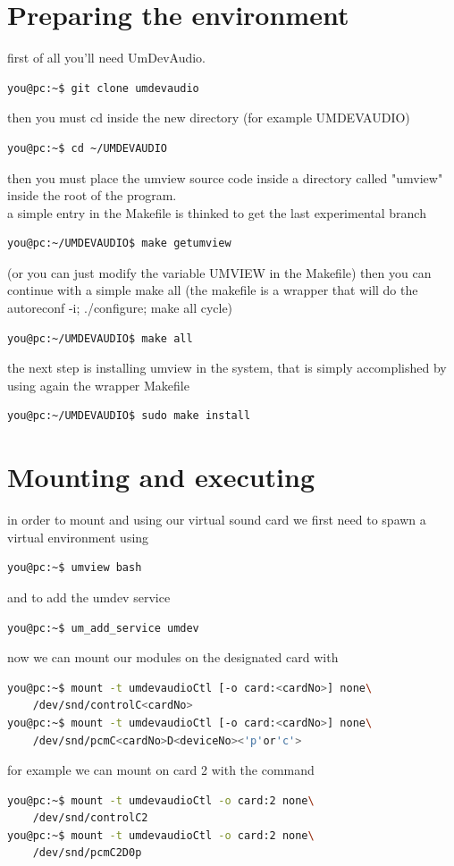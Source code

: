 \documentclass[a4paper,12pt]{article}
\begin{document}
	\section{Preparing the environment}
	first of all you'll need UmDevAudio.\\
	\begin{lstlisting}[frame=double, language=Bash]
you@pc:~$ git clone umdevaudio
	\end{lstlisting}
	then you must cd inside the new directory (for example UMDEVAUDIO)
	\begin{lstlisting}[frame=double, language=Bash]
you@pc:~$ cd ~/UMDEVAUDIO
	\end{lstlisting}
	then you must place the umview source code inside a directory called "umview" inside the root of the program.\\
	a simple entry in the Makefile is thinked to get the last experimental branch
	\begin{lstlisting}[frame=double, language=Bash]
you@pc:~/UMDEVAUDIO$ make getumview
	\end{lstlisting}
	(or you can just modify the variable UMVIEW in the Makefile)
	then you can continue with a simple make all (the makefile is a wrapper that will do the autoreconf -i; ./configure; make all cycle)
	\begin{lstlisting}[frame=double, language=Bash]
you@pc:~/UMDEVAUDIO$ make all
	\end{lstlisting}
	the next step is installing umview in the system, that is simply accomplished by using again the wrapper Makefile
	\begin{lstlisting}[frame=double, language=Bash]
you@pc:~/UMDEVAUDIO$ sudo make install
	\end{lstlisting}

	\section{Mounting and executing}
	in order to mount and using our virtual sound card we first need to spawn a virtual environment using
	\begin{lstlisting}[frame=double, language=Bash]
you@pc:~$ umview bash
	\end{lstlisting}
	and to add the umdev service
	\begin{lstlisting}[frame=double, language=Bash]
you@pc:~$ um_add_service umdev
	\end{lstlisting}
	now we can mount our modules on the designated card with
	\begin{lstlisting}[frame=double, language=Bash]
you@pc:~$ mount -t umdevaudioCtl [-o card:<cardNo>] none\
	/dev/snd/controlC<cardNo>
you@pc:~$ mount -t umdevaudioCtl [-o card:<cardNo>] none\
	/dev/snd/pcmC<cardNo>D<deviceNo><'p'or'c'>
	\end{lstlisting}
	for example we can mount on card 2 with the command
	\begin{lstlisting}[frame=double, language=Bash]
you@pc:~$ mount -t umdevaudioCtl -o card:2 none\
	/dev/snd/controlC2
you@pc:~$ mount -t umdevaudioCtl -o card:2 none\
	/dev/snd/pcmC2D0p
	\end{lstlisting}
\end{document}
